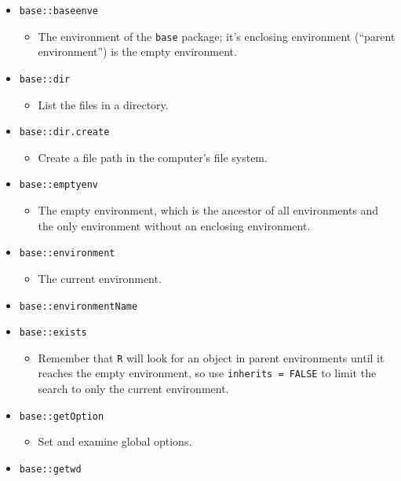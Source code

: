 \documentclass[
]{book}
\providecommand{\tightlist}{%
  \setlength{\itemsep}{0pt}\setlength{\parskip}{0pt}}
\begin{document}
\begin{itemize}
\tightlist
\item
  \texttt{base::baseenve}

  \begin{itemize}
  \tightlist
  \item
    The environment of the \texttt{base} package; it's enclosing environment (``parent environment'') is the empty environment.
  \end{itemize}
\item
  \texttt{base::dir}

  \begin{itemize}
  \tightlist
  \item
    List the files in a directory.
  \end{itemize}
\item
  \texttt{base::dir.create}

  \begin{itemize}
  \tightlist
  \item
    Create a file path in the computer's file system.
  \end{itemize}
\item
  \texttt{base::emptyenv}

  \begin{itemize}
  \tightlist
  \item
    The empty environment, which is the ancestor of all environments and the only environment without an enclosing environment.
  \end{itemize}
\item
  \texttt{base::environment}

  \begin{itemize}
  \tightlist
  \item
    The current environment.
  \end{itemize}
\item
  \texttt{base::environmentName}
\item
  \texttt{base::exists}

  \begin{itemize}
  \tightlist
  \item
    Remember that \texttt{R} will look for an object in parent environments until it reaches the empty environment, so use \texttt{inherits\ =\ FALSE} to limit the search to only the current environment.
  \end{itemize}
\item
  \texttt{base::getOption}

  \begin{itemize}
  \tightlist
  \item
    Set and examine global options.
  \end{itemize}
\item
  \texttt{base::getwd}


\end{itemize}
\end{document}
